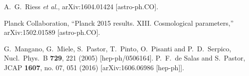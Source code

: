 \documentclass[aps,prd,a4paper,twocolumn,amsmath,showpacs,superscriptaddress,nofootinbib,preprintnumbers]{revtex4-1}
\begin{document}
\begin{thebibliography}{99}
  A.~G.~Riess {\it et al.},
  arXiv:1604.01424 [astro-ph.CO].
  
  Planck Collaboration, ``Planck 2015 results. XIII. Cosmological parameters,''
  arXiv:1502.01589 [astro-ph.CO]. 
  
  G.~Mangano, G.~Miele, S.~Pastor, T.~Pinto, O.~Pisanti and P.~D.~Serpico,
  Nucl.\ Phys.\ B {\bf 729}, 221 (2005)
  [hep-ph/0506164].
  P.~F.~de Salas and S.~Pastor,
  JCAP {\bf 1607}, no. 07, 051 (2016)
  [arXiv:1606.06986 [hep-ph]].
  

\end{thebibliography}
\end{document}
